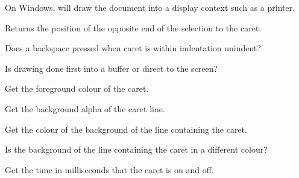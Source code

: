 On Windows, will draw the document into a display context such as a printer.


\label{wxstyledtextctrlgetanchor}


Returns the position of the opposite end of the selection to the caret.


\label{wxstyledtextctrlgetbackspaceunindents}


Does a backspace pressed when caret is within indentation unindent?


\label{wxstyledtextctrlgetbuffereddraw}


Is drawing done first into a buffer or direct to the screen?


\label{wxstyledtextctrlgetcaretforeground}


Get the foreground colour of the caret.


\label{wxstyledtextctrlgetcaretlinebackalpha}


Get the background alpha of the caret line.


\label{wxstyledtextctrlgetcaretlinebackground}


Get the colour of the background of the line containing the caret.


\label{wxstyledtextctrlgetcaretlinevisible}


Is the background of the line containing the caret in a different colour?


\label{wxstyledtextctrlgetcaretperiod}


Get the time in milliseconds that the caret is on and off.


